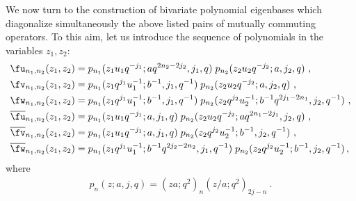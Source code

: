 \documentclass[11pt]{amsart}
\numberwithin{equation}{section}
\numberwithin{equation}{section}
\begin{document}
We now turn to the construction of 
bivariate polynomial eigenbases which diagonalize simultaneously the above listed pairs of mutually commuting operators. To this aim, let us introduce the sequence of polynomials in the variables $z_1,z_2$:
\begin{align}
\label{eq:defu} &   \fu_{n_1,n_2}(z_1,z_2)=p_{n_1}(z_1u_1q^{-j_1};aq^{2n_2-2j_2},j_1,q)\;p_{n_2}(z_2u_2q^{-j_2};a,j_2,q)\ ,\\
 &   \fv_{n_1,n_2}(z_1,z_2)=p_{n_1}(z_1q^{j_1}u_1^{-1};b^{-1},j_1,q^{-1})\;p_{n_2}(z_2u_2q^{-j_2};a,j_2,q)\ ,\\
 &   \fw_{n_1,n_2}(z_1,z_2)=p_{n_1}(z_1q^{j_1}u_1^{-1};b^{-1},j_1,q^{-1})\;p_{n_2}(z_2q^{j_2}u_2^{-1};b^{-1}q^{2j_1-2n_1},j_2,q^{-1})\ ,\\
&   \overline{\fu}_{n_1,n_2}(z_1,z_2)=p_{n_1}(z_1u_1q^{-j_1};a,j_1,q)\;p_{n_2}(z_2u_2q^{-j_2};aq^{2n_1-2j_1},j_2,q)\ ,\\
 &   \overline{\fv}_{n_1,n_2}(z_1,z_2)=p_{n_1}(z_1u_1q^{-j_1};a,j_1,q)\;p_{n_2}(z_2q^{j_2}u_2^{-1};b^{-1},j_2,q^{-1})\ ,\\
 \label{eq:defbw}&   \overline{\fw}_{n_1,n_2}(z_1,z_2)=p_{n_1}(z_1q^{j_1}u_1^{-1};b^{-1}q^{2j_2-2n_2},j_1,q^{-1})\;p_{n_2}(z_2q^{j_2}u_2^{-1};b^{-1},j_2,q^{-1})\,,
\end{align}
where 
\begin{align}
    p_{n}(z;a,j,q)=\left(za;q^2\right)_{n}\left(z/a;q^2\right)_{2j-n}\ .\label{eq:defpn}
\end{align}
\end{document}
